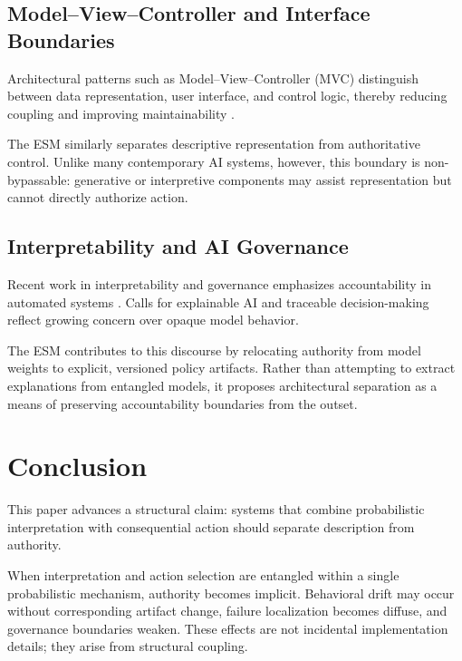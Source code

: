 \documentclass[11pt]{article}
\begin{document}
\subsection{Model–View–Controller and Interface Boundaries}

Architectural patterns such as Model–View–Controller (MVC) distinguish between data representation, user interface, and control logic, thereby reducing coupling and improving maintainability \citep{reenskaug1979}. 

The ESM similarly separates descriptive representation from authoritative control. Unlike many contemporary AI systems, however, this boundary is non-bypassable: generative or interpretive components may assist representation but cannot directly authorize action.

\subsection{Interpretability and AI Governance}

Recent work in interpretability and governance emphasizes accountability in automated systems \citep{doshi2017, mittelstadt2016}. Calls for explainable AI and traceable decision-making reflect growing concern over opaque model behavior.

The ESM contributes to this discourse by relocating authority from model weights to explicit, versioned policy artifacts. Rather than attempting to extract explanations from entangled models, it proposes architectural separation as a means of preserving accountability boundaries from the outset.



\section{Conclusion}

This paper advances a structural claim: systems that combine probabilistic interpretation with consequential action should separate description from authority.

When interpretation and action selection are entangled within a single probabilistic mechanism, authority becomes implicit. Behavioral drift may occur without corresponding artifact change, failure localization becomes diffuse, and governance boundaries weaken. These effects are not incidental implementation details; they arise from structural coupling.
\end{document}
